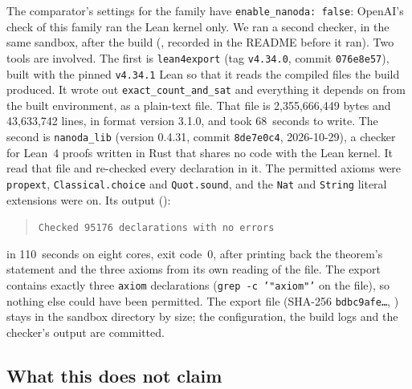 The comparator's settings for the family have \texttt{enable\_nanoda:
false}: OpenAI's check of this family ran the Lean kernel only. We ran a
second checker, in the same sandbox, after the build
(, recorded in the README before it
ran). Two tools are involved. The first is \texttt{lean4export} (tag
\texttt{v4.34.0}, commit \texttt{076e8e57}), built with the pinned
\texttt{v4.34.1} Lean so that it reads the compiled files the build
produced. It wrote out \texttt{exact\_count\_and\_sat} and everything it
depends on from the built environment, as a plain-text file. That file is
2,355,666,449 bytes and 43,633,742 lines, in format version 3.1.0, and took
68~seconds to write. The second is \texttt{nanoda\_lib} \citep{Nanoda} (version 0.4.31,
commit \texttt{8de7e0c4}, 2026-10-29), a checker for Lean~4 proofs
written in Rust that shares no code with the Lean kernel. It read that
file and re-checked every declaration in it. The permitted axioms were \texttt{propext},
\texttt{Classical.choice} and \texttt{Quot.sound}, and the \texttt{Nat} and \texttt{String} literal extensions were on.
Its output ():
\begin{quote}
\texttt{Checked 95176 declarations with no errors}
\end{quote}
in 110~seconds on eight cores, exit code~0, after printing back the
theorem's statement and the three axioms from its own reading of the
file. The export contains exactly three \texttt{axiom} declarations
(\texttt{grep -c '"axiom"'} on the file), so nothing else could have
been permitted. The export file (SHA-256 \texttt{bdbc9afe…},
) stays in the
sandbox directory by size; the configuration, the build logs and the
checker's output are committed.

\subsection{What this does not claim}

